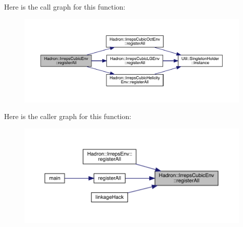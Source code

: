 Here is the call graph for this function\+:\nopagebreak
\begin{figure}[H]
\begin{center}
\leavevmode
\includegraphics[width=350pt]{d6/d00/namespaceHadron_1_1IrrepsCubicEnv_a180ad30fa93d4d682cf36167092198ba_cgraph}
\end{center}
\end{figure}
Here is the caller graph for this function\+:
\nopagebreak
\begin{figure}[H]
\begin{center}
\leavevmode
\includegraphics[width=350pt]{d6/d00/namespaceHadron_1_1IrrepsCubicEnv_a180ad30fa93d4d682cf36167092198ba_icgraph}
\end{center}
\end{figure}
